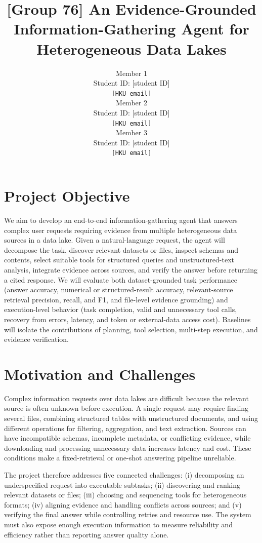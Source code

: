 \documentclass{article}
\title{[Group 76] An Evidence-Grounded Information-Gathering Agent for Heterogeneous Data Lakes}
\author{
  Member 1 \\ Student ID: [student ID] \\ \texttt{[HKU email]} \\
  \And
  Member 2 \\ Student ID: [student ID] \\ \texttt{[HKU email]} \\
  \And
  Member 3 \\ Student ID: [student ID] \\ \texttt{[HKU email]}
}
\begin{document}
\maketitle

\section{Project Objective}

We aim to develop an end-to-end information-gathering agent that answers complex user requests requiring evidence from multiple heterogeneous data sources in a data lake. Given a natural-language request, the agent will decompose the task, discover relevant datasets or files, inspect schemas and contents, select suitable tools for structured queries and unstructured-text analysis, integrate evidence across sources, and verify the answer before returning a cited response. We will evaluate both dataset-grounded task performance (answer accuracy, numerical or structured-result accuracy, relevant-source retrieval precision, recall, and F1, and file-level evidence grounding) and execution-level behavior (task completion, valid and unnecessary tool calls, recovery from errors, latency, and token or external-data access cost). Baselines will isolate the contributions of planning, tool selection, multi-step execution, and evidence verification.

\section{Motivation and Challenges}

Complex information requests over data lakes are difficult because the relevant source is often unknown before execution. A single request may require finding several files, combining structured tables with unstructured documents, and using different operations for filtering, aggregation, and text extraction. Sources can have incompatible schemas, incomplete metadata, or conflicting evidence, while downloading and processing unnecessary data increases latency and cost. These conditions make a fixed-retrieval or one-shot answering pipeline unreliable.

The project therefore addresses five connected challenges: (i) decomposing an underspecified request into executable subtasks; (ii) discovering and ranking relevant datasets or files; (iii) choosing and sequencing tools for heterogeneous formats; (iv) aligning evidence and handling conflicts across sources; and (v) verifying the final answer while controlling retries and resource use. The system must also expose enough execution information to measure reliability and efficiency rather than reporting answer quality alone.
\end{document}
